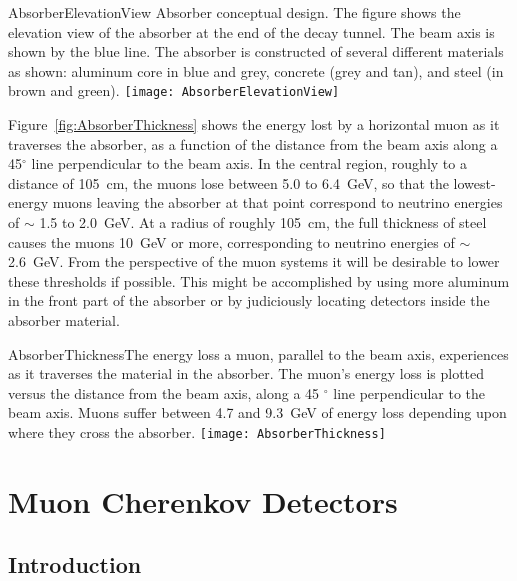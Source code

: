 \begin{cdrfigure}{AbsorberElevationView}
{Absorber conceptual design. The figure shows the elevation view of the 
absorber at the end of the decay tunnel. The beam axis is shown by
the blue line. The absorber is constructed of several different 
materials as shown: aluminum core in blue and grey, concrete 
(grey and tan), and steel (in brown and green).}
\texttt{[image: AbsorberElevationView]}
\end{cdrfigure}

Figure~\ref{fig:AbsorberThickness} shows the energy lost by a
horizontal muon as it traverses the absorber, as a function of the
distance from the beam axis along a 45$^\circ$ line perpendicular to the beam axis. 
In the central region, roughly to a distance of  105~cm, the muons lose between 5.0 to 6.4~GeV, so that the
lowest-energy muons leaving the absorber at that point correspond to
neutrino energies of $\sim$ 1.5 to 2.0~GeV. At a radius of roughly 105~cm, the
full thickness of steel causes the muons 10~GeV or more,
corresponding to neutrino energies of $\sim$ 2.6~GeV. From the
perspective of the muon systems it will be desirable to lower these
thresholds if possible. This might be accomplished by using more
aluminum in the front part of the absorber or by judiciously locating detectors inside the 
absorber material. 

\begin{cdrfigure}{AbsorberThickness}{The energy loss a muon, parallel to the beam axis, experiences as it traverses the material in the absorber. The muon's energy loss is plotted versus the distance from the beam axis, along a 45 $^\circ$ line perpendicular to the beam axis. Muons suffer between 4.7 and 9.3~GeV of energy loss depending upon where they cross the absorber.}
\texttt{[image: AbsorberThickness]}
\end{cdrfigure}

%
%
\section{Muon Cherenkov Detectors} %
\label{sec:nd-blm-muon-cherenkov}

\subsection{Introduction}

